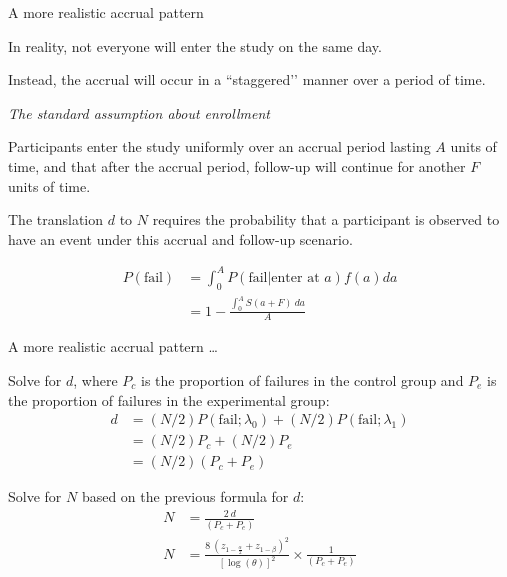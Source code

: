 \documentclass[ignorenonframetext,]{beamer}
\begin{document}
\begin{frame}{%
\protect\hypertarget{a-more-realistic-accrual-pattern}{%
A more realistic accrual pattern}}

In reality, not everyone will enter the study on the same day.

Instead, the accrual will occur in a ``staggered’’ manner over a period
of time.

\emph{The standard assumption about enrollment}

Participants enter the study uniformly over an accrual period lasting
\(A\) units of time, and that after the accrual period, follow-up will
continue for another \(F\) units of time.

The translation \(d\) to \(N\) requires the probability that a
participant is observed to have an event under this accrual and
follow-up scenario.

\begin{align}
\nonumber
P(\text{fail}) &=  
\int_{0}^{A} P(\text{fail}|\text{enter at } a) f(a) da \\[1ex]
&= 1-\frac{\int_{0}^{A} S(a+F)~ da}{A}
\label{exactP}
\end{align}

\end{frame}

\begin{frame}{%
\protect\hypertarget{a-more-realistic-accrual-pattern-1}{%
A more realistic accrual pattern \ldots}}

Solve for \(d\), where \(P_c\) is the proportion of failures in the
control group and \(P_e\) is the proportion of failures in the
experimental group: \begin{align*}
d &= (N/2) P(\text{fail};\lambda_0) +(N/2) P(\text{fail};\lambda_1)\\
  &= (N/2) P_c + (N/2) P_e\\
  &= (N/2) (P_c + P_e)
\end{align*}

Solve for \(N\) based on the previous formula for \(d\): \begin{align*}
N &= \frac{2~d}{(P_c + P_e)}\\[1ex]
N &= \frac{8 ~ \left(z_{1-\frac{\alpha}{2}} + z_{1-\beta}\right)^2}
{[\log(\theta)]^2} \times \frac{1}{(P_c + P_e)}
\end{align*}

\end{frame}
\end{document}
